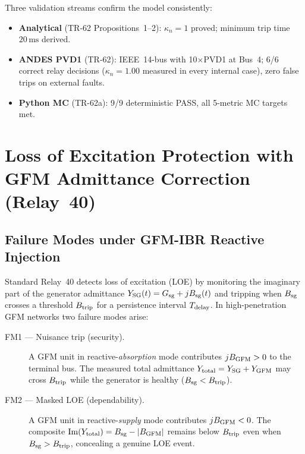 Three validation streams confirm the model consistently:
\begin{itemize}
  \item \textbf{Analytical} (TR-62 Propositions~1--2): $\kappa_n = 1$ proved;
    minimum trip time $20\,\text{ms}$ derived.
  \item \textbf{ANDES PVD1} (TR-62): IEEE~14-bus with 10$\times$PVD1 at Bus~4;
    6/6 correct relay decisions ($\kappa_n = 1.00$ measured in every internal
    case), zero false trips on external faults.
  \item \textbf{Python MC} (TR-62a): 9/9 deterministic PASS, all 5-metric MC
    targets met.
\end{itemize}

\section{Loss of Excitation Protection with GFM Admittance Correction (Relay~40)}
\label{sec:ch6_relay40}

\subsection{Failure Modes under GFM-IBR Reactive Injection}
\label{sec:ch6_loe_fm}

Standard Relay~40 detects loss of excitation (LOE) by monitoring the imaginary
part of the generator admittance $Y_{\rm SG}(t) = G_{\rm sg} + jB_{\rm sg}(t)$
and tripping when $B_{\rm sg}$ crosses a threshold $B_{\rm trip}$ for a
persistence interval $T_{\rm delay}$.
In high-penetration GFM networks two failure modes arise:

\begin{description}
  \item[FM1 — Nuisance trip (security).]
    A GFM unit in reactive-\emph{absorption} mode contributes $jB_{\rm GFM} > 0$
    to the terminal bus.  The measured total admittance
    $Y_{\rm total} = Y_{\rm SG} + Y_{\rm GFM}$ may cross $B_{\rm trip}$ while
    the generator is healthy ($B_{\rm sg} < B_{\rm trip}$).

  \item[FM2 — Masked LOE (dependability).]
    A GFM unit in reactive-\emph{supply} mode contributes $jB_{\rm GFM} < 0$.
    The composite $\Im(Y_{\rm total}) = B_{\rm sg} - |B_{\rm GFM}|$ remains
    below $B_{\rm trip}$ even when $B_{\rm sg} > B_{\rm trip}$, concealing a
    genuine LOE event.
\end{description}

